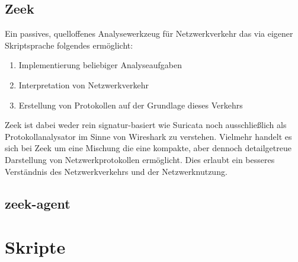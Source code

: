 \subsection{Zeek}
Ein passives, quelloffenes Analysewerkzeug für Netzwerkverkehr das via eigener  Skriptsprache folgendes ermöglicht:
\begin{enumerate}
\item{Implementierung beliebiger Analyseaufgaben}
\item{Interpretation von Netzwerkverkehr}
\item{Erstellung von Protokollen auf der Grundlage dieses Verkehrs}
\end{enumerate}
Zeek ist dabei weder rein signatur-basiert wie Suricata noch ausschließlich als Protokollanalysator im Sinne von Wireshark zu verstehen. Vielmehr handelt es sich bei Zeek um eine Mischung die eine kompakte, aber dennoch detailgetreue Darstellung von Netzwerkprotokollen ermöglicht. Dies erlaubt ein besseres Verständnis des Netzwerkverkehrs und der Netzwerknutzung.
\subsection{zeek-agent}
\section{Skripte}
